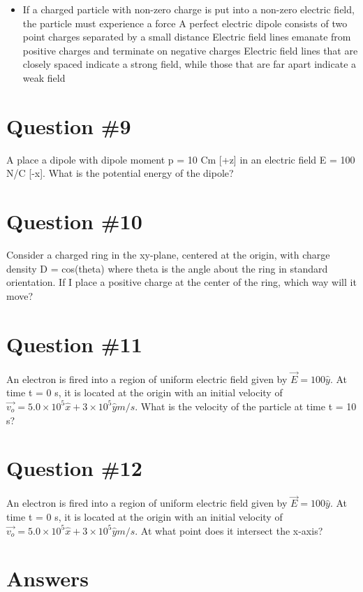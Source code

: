 \documentclass[12pt]{article}
\begin{document}
\begin{itemize}
\item If a charged particle with non-zero charge is put into a non-zero electric field, the particle must experience a force
 A perfect electric dipole consists of two point charges separated by a small distance
 Electric field lines emanate from positive charges and terminate on negative charges
 Electric field lines that are closely spaced indicate a strong field, while those that are far apart indicate a weak field
\end{itemize}

\section*{Question \#9}
A place a dipole with dipole moment p = 10 Cm [+z] in an electric field E = 100 N/C [-x].  What is the potential energy of the dipole?

\section*{Question \#10}
Consider a charged ring in the xy-plane, centered at the origin, with charge density D = cos(theta) where theta is the angle about the ring in standard orientation.  If I place a positive charge at the center of the ring, which way will it move?

\section*{Question \#11}
An electron is fired into a region of uniform electric field given by $\vec{E} = 100\hat{y}$. At time t = 0 s, it is located at the origin with an initial velocity of $\vec{v_o} = 5.0 \times 10^5 \hat{x} + 3 \times 10^5 \hat{y} m/s$.  What is the velocity of the particle at time t = 10 s?

\section*{Question \#12}
An electron is fired into a region of uniform electric field given by $\vec{E} = 100\hat{y}$. At time t = 0 s, it is located at the origin with an initial velocity of $\vec{v_o} = 5.0 \times 10^5 \hat{x} + 3 \times 10^5 \hat{y} m/s$.  At what point does it intersect the x-axis?

\section*{Answers}
\end{document}
